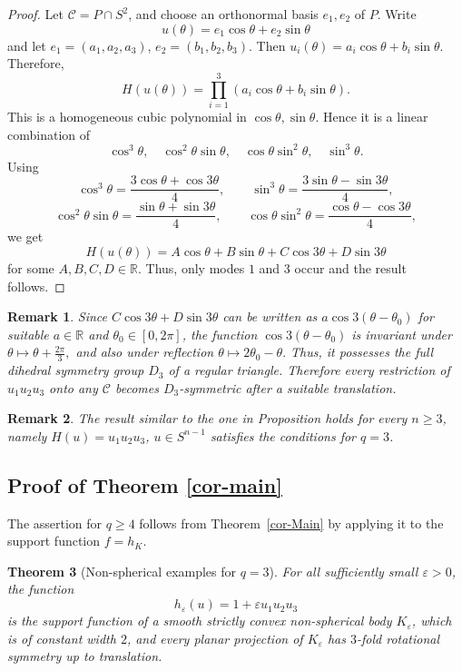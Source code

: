 \documentclass[11pt]{article}
\newtheorem{theorem}{Theorem}[section]
\newtheorem{remark}[theorem]{Remark}
\theoremstyle{definition}
\begin{document}
\begin{proof}
Let \({\mathcal C}=P\cap S^2\), and choose an orthonormal basis \(e_1,e_2\) of \(P\). Write  
$$
u(\theta)=e_1\cos\theta+e_2\sin\theta
$$
 and let 
$e_1=(a_1,a_2,a_3)$, $e_2=(b_1,b_2,b_3)$.
Then
$u_i(\theta)=a_i\cos\theta+b_i\sin\theta$.
Therefore,
\[
H(u(\theta))
=
\prod_{i=1}^{3}(a_i\cos\theta+b_i\sin\theta).
\]
This is a homogeneous cubic polynomial in \(\cos\theta,\sin\theta\). Hence it is a linear
combination of
\[
\cos^3\theta,\quad
\cos^2\theta\sin\theta,\quad
\cos\theta\sin^2\theta,\quad
\sin^3\theta.
\]
Using
\[
\cos^3\theta=\frac{3\cos\theta+\cos3\theta}{4},\qquad
\sin^3\theta=\frac{3\sin\theta-\sin3\theta}{4},
\]
\[
\cos^2\theta\sin\theta=\frac{\sin\theta+\sin3\theta}{4},\qquad 
\cos\theta\sin^2\theta=\frac{\cos\theta-\cos3\theta}{4},
\]
we get
\[
H(u(\theta))
=
A\cos\theta+B\sin\theta+C\cos3\theta+D\sin3\theta
\]
for some $A,B, C, D\in{\mathbb R}$.
Thus, only modes \(1\) and \(3\) occur and the result follows.
\end{proof}




\begin{remark}
Since $C\cos3\theta+D\sin3\theta$ can be written as $a\cos3(\theta-\theta_0)$ for suitable $a\in\mathbb R$ and $\theta_0\in[0,2\pi]$, the function  \(\cos 3(\theta-\theta_0)\) is invariant under
$
\theta
\mapsto
\theta+\frac{2\pi}{3},
$
and also under reflection
$
\theta
\mapsto
2\theta_0-\theta .
$
Thus, it possesses the full dihedral symmetry group \(D_3\) of a regular
triangle.
Therefore every restriction of \(u_1u_2u_3\) onto any ${\mathcal C}$ becomes
\(D_3\)-symmetric after a suitable translation.
\end{remark}


\begin{remark}
	The  result similar to the one in Proposition holds for every $n\ge 3$, namely $H(u)=u_1u_2u_3$, $u\in S^{n-1}$ satisfies the conditions  for $q=3$.
\end{remark}



\subsection{Proof of Theorem \ref{cor-main}}

The assertion for $q\ge4$ follows from Theorem~\ref{cor-Main} by applying it to the support function $f=h_K$. 


\begin{theorem}[Non-spherical examples for \(q=3\)]
For all sufficiently small \(\varepsilon>0\), the function
\[
h_\varepsilon(u)=1+\varepsilon u_1u_2u_3
\]
is the support function of a smooth strictly convex non-spherical body \(K_\varepsilon\), which is of constant width $2$, 
and every planar projection of \(K_\varepsilon\) has \(3\)-fold rotational symmetry up
to translation. 
\end{theorem}
\end{document}
